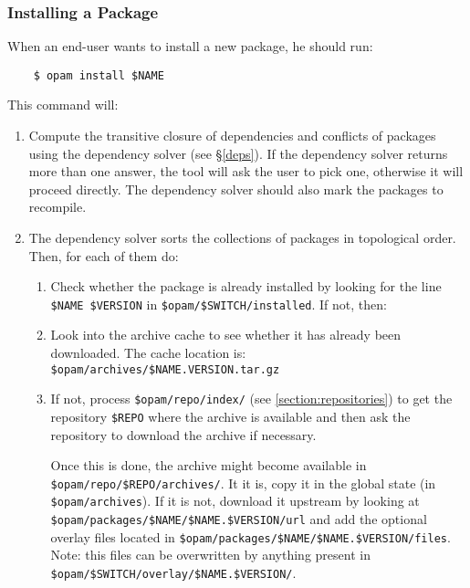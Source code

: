 \documentclass[a4paper,10pt]{article}
\begin{document}
\subsubsection{Installing a Package}
\label{opam-install}

When an end-user wants to install a new package, he should run:

\begin{verbatim}
    $ opam install $NAME
\end{verbatim}

This command will:

\begin{enumerate}

\item Compute the transitive closure of dependencies and conflicts of
  packages using the dependency solver (see \S\ref{deps}). If the
  dependency solver returns more than one answer, the tool will ask
  the user to pick one, otherwise it will proceed directly. The
  dependency solver should also mark the packages to recompile.

\item The dependency solver sorts the collections of packages in
  topological order. Then, for each of them do:

\begin{enumerate}

\item Check whether the package is already installed by looking for
  the line \verb+$NAME $VERSION+ in \verb+$opam/$SWITCH/installed+.
  If not, then:

\item Look into the archive cache to see whether it has already been
  downloaded. The cache location is:
  \verb+$opam/archives/$NAME.VERSION.tar.gz+

\item If not, process \verb+$opam/repo/index/+ (see
  \ref{section:repositories}) to get the repository
  \verb+$REPO+ where the archive is available and then ask the
  repository to download the archive if necessary.

  Once this is done, the archive might become available in
  \verb+$opam/repo/$REPO/archives/+. It it is, copy it in the global
  state (in \verb+$opam/archives+). If it is not, download it upstream
  by looking at \verb|$opam/packages/$NAME/$NAME.$VERSION/url| and add
  the optional overlay files located in
  \verb|$opam/packages/$NAME/$NAME.$VERSION/files|. Note: this files
  can be overwritten by anything present in
  \verb|$opam/$SWITCH/overlay/$NAME.$VERSION/|.


\end{enumerate}
\end{enumerate}
\end{document}
